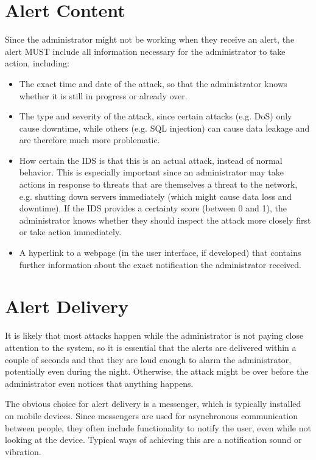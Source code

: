 \documentclass[oneside, english]{reports/assets/sdqtechreport}
\begin{document}
\section{Alert Content}
\label{sec:AlertContent}
Since the administrator might not be working when they receive an alert, the
alert MUST include all information necessary for the administrator to take
action, including:
\begin{itemize}
	\item The exact time and date of the attack, so that the administrator knows
	whether it is still in progress or already over.
	\item The type and severity of the attack, since certain attacks (e.g. DoS)
	only cause downtime, while others (e.g. SQL injection) can cause data leakage
	and are therefore much more problematic.
	\item How certain the IDS is that this is an actual attack, instead of normal
	behavior. This is especially important since an administrator may take
	actions in response to threats that are themselves a threat to the network,
	e.g. shutting down servers immediately (which might cause data loss and
	downtime). If the IDS provides a certainty score (between 0 and 1), the
	administrator knows whether they should inspect the attack more closely first
	or take action immediately.
	\item A hyperlink to a webpage (in the user interface, if developed)
	that contains further information about the exact notification the
	administrator received.
\end{itemize}

\section{Alert Delivery}
\label{sec:AlertDelivery}
It is likely that most attacks happen while the administrator is not paying
close attention to the system, so it is essential that the alerts are
delivered within a couple of seconds and that they are loud enough to alarm
the administrator, potentially even during the night. Otherwise, the attack
might be over before the administrator even notices that anything happens.

The obvious choice for alert delivery is a messenger, which is typically
installed on mobile devices. Since messengers are used for asynchronous
communication between people, they often include functionality to notify
the user, even while not looking at the device. Typical ways of achieving
this are a notification sound or vibration.
\end{document}
